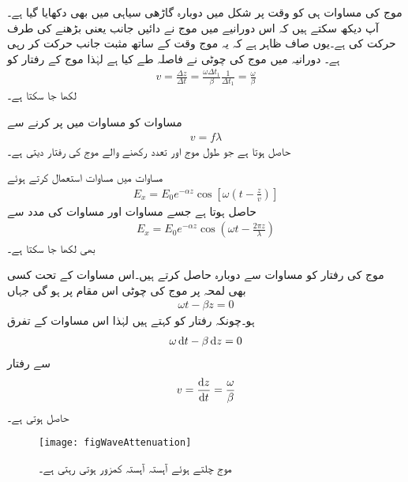 موج کی مساوات ہی کو وقت  پر شکل  میں دوبارہ گاڑھی سیاہی میں بھی دکھایا گیا ہے۔آپ دیکھ سکتے ہیں کہ اس دورانیے میں موج نے دائیں جانب یعنی  بڑھنے کی طرف حرکت کی ہے۔یوں صاف ظاہر ہے کہ یہ موج وقت کے ساتھ مثبت  جانب حرکت کر رہی ہے۔ دورانیہ  میں موج کی چوٹی نے  فاصلہ طے کیا ہے لہٰذا موج کے رفتار کو
\begin{align}\label{مساوات_موج_رفتار_اور_تعدد}
v=\frac{\Delta z}{\Delta t}=\frac{\omega \Delta t_1}{\beta} \frac{1}{\Delta t_1}=\frac{\omega}{\beta}
\end{align}
لکھا جا سکتا ہے۔

مساوات  کو  مساوات  میں پر کرنے سے
\begin{align}
v=f \lambda
\end{align}
حاصل ہوتا ہے جو  طول موج  اور  تعدد رکھنے والے موج کی رفتار  دیتی ہے۔

مساوات  میں مساوات  استعمال کرتے ہوئے
\begin{align}
E_x=E_0 e^{-\alpha z} \cos \left[ \omega \left(t-\frac{z}{v} \right)\right]
\end{align}
حاصل ہوتا ہے جسے مساوات  اور مساوات  کی مدد سے
\begin{align}
E_x=E_0 e^{-\alpha z} \cos \left(\omega  t-\frac{2 \pi z}{\lambda}\right)
\end{align}
بھی لکھا جا سکتا ہے۔

موج کی رفتار کو مساوات  سے دوبارہ حاصل کرتے ہیں۔اس مساوات کے تحت کسی بھی لمحہ  پر موج کی چوٹی اس مقام پر ہو گی جہاں
\begin{align*}
\omega t -\beta z=0
\end{align*}
ہو۔چونکہ رفتار  کو کہتے ہیں لہٰذا اس مساوات کے تفرق
\begin{align*}
\omega \dif t-\beta \dif z=0
\end{align*}
سے رفتار
\begin{align}
v=\frac{\dif z}{\dif t}=\frac{\omega}{\beta}
\end{align}
حاصل ہوتی ہے۔

\begin{figure}
\centering
\texttt{[image: figWaveAttenuation]}
\caption{موج چلتے ہوئے آہستہ آہستہ کمزور ہوتی رہتی ہے۔}
\label{شکل_موج_کمزوری}
\end{figure}


